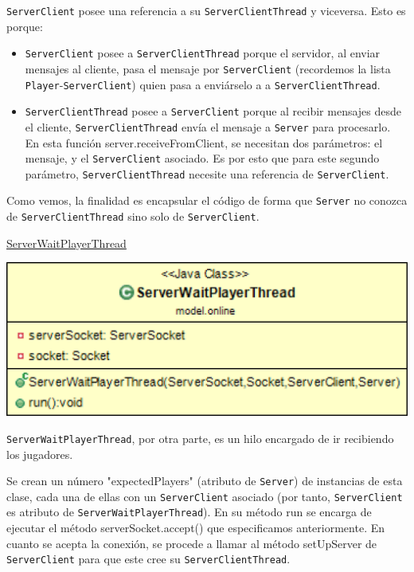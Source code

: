 \documentclass[12pt,a4paper,openright]{book}
\theoremstyle{break}
\begin{document}
\texttt{ServerClient} posee una referencia a su \texttt{ServerClientThread} y viceversa. Esto es porque:

\begin{itemize}
\item \texttt{ServerClient} posee a \texttt{ServerClientThread} porque el servidor, al enviar mensajes al cliente, pasa el mensaje por \texttt{ServerClient} (recordemos la lista \texttt{Player}-\texttt{ServerClient}) quien pasa a enviárselo a a \texttt{ServerClientThread}.
\item \texttt{ServerClientThread} posee a \texttt{ServerClient} porque al recibir mensajes desde el cliente, \texttt{ServerClientThread} envía el mensaje a \texttt{Server} para procesarlo. En esta función server.receiveFromClient, se necesitan dos parámetros: el mensaje, y el \texttt{ServerClient} asociado. Es por esto que para este segundo parámetro, \texttt{ServerClientThread} necesite una referencia de \texttt{ServerClient}.
\end{itemize}

Como vemos, la finalidad es encapsular el código de forma que \texttt{Server} no conozca de \texttt{ServerClientThread} sino solo de \texttt{ServerClient}.


\newpage

\underline{ServerWaitPlayerThread}

\begin{center}
\includegraphics[scale=0.3]{WaitPlayerThread-sprint7.png} 
\end{center}

\texttt{ServerWaitPlayerThread}, por otra parte, es un hilo encargado de ir recibiendo los jugadores.

Se crean un número "expectedPlayers" (atributo de \texttt{Server}) de instancias de esta clase, cada una de ellas con un \texttt{ServerClient} asociado (por tanto, \texttt{ServerClient} es atributo de \texttt{ServerWaitPlayerThread}). En su método run se encarga de ejecutar el método serverSocket.accept() que especificamos anteriormente. En cuanto se acepta la conexión, se procede a llamar al método setUpServer de \texttt{ServerClient} para que este cree su \texttt{ServerClientThread}.
\end{document}
